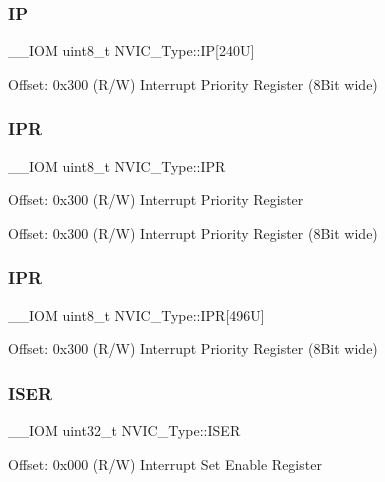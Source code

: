 \subsubsection{\texorpdfstring{IP}{IP}\hspace{0.1cm}{\footnotesize\ttfamily [2/2]}}
{\footnotesize\ttfamily \+\_\+\+\_\+\+I\+OM uint8\+\_\+t N\+V\+I\+C\+\_\+\+Type\+::\+IP\mbox{[}240\+U\mbox{]}}

Offset\+: 0x300 (R/W) Interrupt Priority Register (8Bit wide) \mbox{\label{struct_n_v_i_c___type_a71598b2d46c2fa6708a7908a1c63c43c}} 
\subsubsection{\texorpdfstring{IPR}{IPR}\hspace{0.1cm}{\footnotesize\ttfamily [1/2]}}
{\footnotesize\ttfamily \+\_\+\+\_\+\+I\+OM uint8\+\_\+t N\+V\+I\+C\+\_\+\+Type\+::\+I\+PR}

Offset\+: 0x300 (R/W) Interrupt Priority Register

Offset\+: 0x300 (R/W) Interrupt Priority Register (8Bit wide) \mbox{\label{struct_n_v_i_c___type_adfd45d2d45654c4e775017800f33e9a3}} 
\subsubsection{\texorpdfstring{IPR}{IPR}\hspace{0.1cm}{\footnotesize\ttfamily [2/2]}}
{\footnotesize\ttfamily \+\_\+\+\_\+\+I\+OM uint8\+\_\+t N\+V\+I\+C\+\_\+\+Type\+::\+I\+PR\mbox{[}496\+U\mbox{]}}

Offset\+: 0x300 (R/W) Interrupt Priority Register (8Bit wide) \mbox{\label{struct_n_v_i_c___type_a06726c729c5557701defc4d6b5d8f9f6}} 
\subsubsection{\texorpdfstring{ISER}{ISER}}
{\footnotesize\ttfamily \+\_\+\+\_\+\+I\+OM uint32\+\_\+t N\+V\+I\+C\+\_\+\+Type\+::\+I\+S\+ER}

Offset\+: 0x000 (R/W) Interrupt Set Enable Register \mbox{\label{struct_n_v_i_c___type_a288bc5e8b844a531a6ecdcc8dbcb8050}} 
